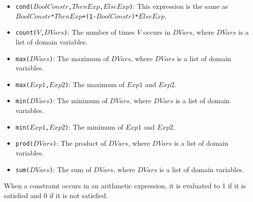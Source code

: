 \begin{itemize}
\item \texttt{cond($BoolConstr$,$ThenExp$,$ElseExp$)}: This expression is the same as\\ \texttt{$BoolConstr$*$ThenExp$+(1-$BoolConstr$)*$ElseExp$}.
\item \texttt{count($V$,$DVars$)}: The number of times $V$ occurs in $DVars$, where $DVars$ is a list of domain variables.
\item \texttt{max($DVars$)}: The maximum of $DVars$, where $DVars$ is a list of domain variables.
\item \texttt{max($Exp1$,$Exp2$)}: The maximum of $Exp1$ and $Exp2$.
\item \texttt{min($DVars$)}: The minimum of $DVars$, where $DVars$ is a list of domain variables.
\item \texttt{min($Exp1$,$Exp2$)}: The minimum of $Exp1$ and $Exp2$.
\item \texttt{prod($DVars$)}: The product of $DVars$, where $DVars$ is a list of domain variables.
\item \texttt{sum($DVars$)}: The sum of $DVars$, where $DVars$ is a list of domain variables.
\end{itemize}
When a constraint occurs in an arithmetic expression, it is evaluated to 1 if it is satisfied and 0 if it is not satisfied.

